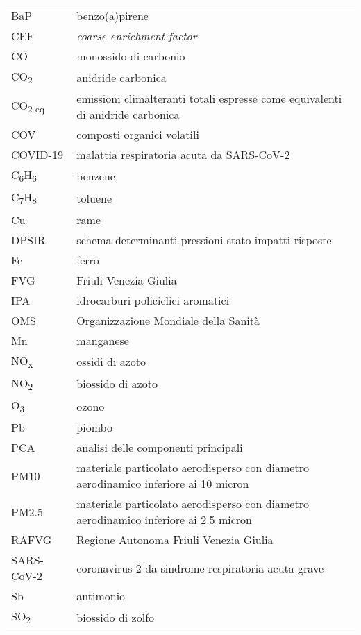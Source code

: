 \begin{tabular}{ll}
     BaP            & benzo(a)pirene\\
     CEF            & \textit{coarse enrichment factor}\\
     CO             & monossido di carbonio \\
     CO\textsubscript{2}& anidride carbonica \\
     CO\textsubscript{2 eq}& emissioni climalteranti totali espresse come equivalenti di anidride carbonica \\
     COV            & composti organici volatili\\
     COVID-19       & malattia respiratoria acuta da SARS-CoV-2 \\
     C\textsubscript{6}H\textsubscript{6}& benzene \\
     C\textsubscript{7}H\textsubscript{8}& toluene \\
     Cu             & rame\\
     DPSIR          & schema determinanti-pressioni-stato-impatti-risposte\\
     Fe             & ferro\\
     FVG            & Friuli Venezia Giulia\\
     IPA            & idrocarburi policiclici aromatici\\
     OMS            & Organizzazione Mondiale della Sanità\\
     Mn             & manganese\\
     NO\textsubscript{x}& ossidi di azoto \\
     NO\textsubscript{2}& biossido di azoto \\
     O\textsubscript{3}& ozono \\
     Pb             & piombo\\
     PCA            & analisi delle componenti principali\\
     PM10           & materiale particolato aerodisperso con diametro aerodinamico inferiore ai 10 micron\\
     PM2.5          & materiale particolato aerodisperso con diametro aerodinamico inferiore ai 2.5 micron\\
     RAFVG          & Regione Autonoma Friuli Venezia Giulia\\
     SARS-CoV-2     & coronavirus 2 da sindrome respiratoria acuta grave \\
     Sb             & antimonio\\
     SO\textsubscript{2}& biossido di zolfo \\
\end{tabular}